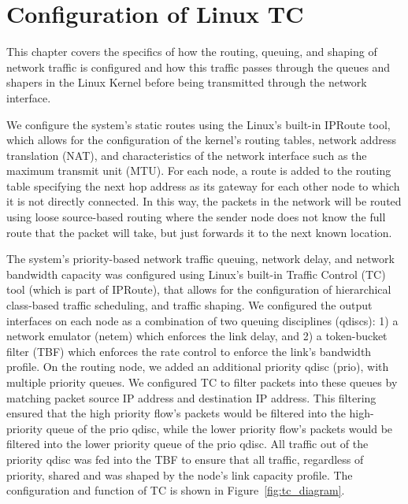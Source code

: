 \chapter{Configuration of Linux TC}
\label{ch:tc}

This chapter covers the specifics of how the routing, queuing, and
shaping of network traffic is configured and how this traffic passes
through the queues and shapers in the Linux Kernel before being
transmitted through the network interface.

We configure the system's static routes using the Linux's built-in
IPRoute\cite{linux_iproute} tool, which allows for the configuration
of the kernel's routing tables, network address translation (NAT), and
characteristics of the network interface such as the maximum transmit
unit (MTU).  For each node, a route is added to the routing table
specifying the next hop address as its gateway for each other node to
which it is not directly connected.  In this way, the packets in the
network will be routed using loose source-based routing where the
sender node does not know the full route that the packet will take,
but just forwards it to the next known location.

The system's priority-based network traffic queuing, network delay,
and network bandwidth capacity was configured using Linux's built-in
Traffic Control (TC)\cite{linux_tc} tool (which is part of IPRoute),
that allows for the configuration of hierarchical class-based traffic
scheduling, and traffic shaping.  We configured the output interfaces
on each node as a combination of two queuing disciplines (qdiscs): 1)
a network emulator (netem) which enforces the link delay, and 2) a
token-bucket filter (TBF) which enforces the rate control to enforce
the link's bandwidth profile.  On the routing node, we added an
additional priority qdisc (prio), with multiple priority queues.  We
configured TC to filter packets into these queues by matching packet
source IP address and destination IP address.  This filtering ensured
that the high priority flow's packets would be filtered into the
high-priority queue of the prio qdisc, while the lower priority flow's
packets would be filtered into the lower priority queue of the prio
qdisc.  All traffic out of the priority qdisc was fed into the TBF to
ensure that all traffic, regardless of priority, shared and was shaped
by the node's link capacity profile.  The configuration and function
of TC is shown in Figure~\ref{fig:tc_diagram}.

